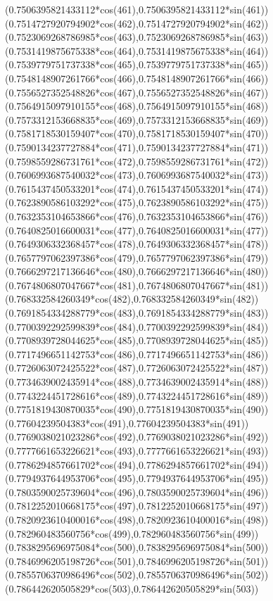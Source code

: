 {({0.7506395821433112*cos(461)},{0.7506395821433112*sin(461)})
({0.7514727920794902*cos(462)},{0.7514727920794902*sin(462)})
({0.7523069268786985*cos(463)},{0.7523069268786985*sin(463)})
({0.7531419875675338*cos(464)},{0.7531419875675338*sin(464)})
({0.7539779751737338*cos(465)},{0.7539779751737338*sin(465)})
({0.7548148907261766*cos(466)},{0.7548148907261766*sin(466)})
({0.7556527352548826*cos(467)},{0.7556527352548826*sin(467)})
({0.7564915097910155*cos(468)},{0.7564915097910155*sin(468)})
({0.7573312153668835*cos(469)},{0.7573312153668835*sin(469)})
({0.7581718530159407*cos(470)},{0.7581718530159407*sin(470)})
({0.7590134237727884*cos(471)},{0.7590134237727884*sin(471)})
({0.7598559286731761*cos(472)},{0.7598559286731761*sin(472)})
({0.7606993687540032*cos(473)},{0.7606993687540032*sin(473)})
({0.7615437450533201*cos(474)},{0.7615437450533201*sin(474)})
({0.7623890586103292*cos(475)},{0.7623890586103292*sin(475)})
({0.7632353104653866*cos(476)},{0.7632353104653866*sin(476)})
({0.7640825016600031*cos(477)},{0.7640825016600031*sin(477)})
({0.7649306332368457*cos(478)},{0.7649306332368457*sin(478)})
({0.7657797062397386*cos(479)},{0.7657797062397386*sin(479)})
({0.7666297217136646*cos(480)},{0.7666297217136646*sin(480)})
({0.7674806807047667*cos(481)},{0.7674806807047667*sin(481)})
({0.768332584260349*cos(482)},{0.768332584260349*sin(482)})
({0.7691854334288779*cos(483)},{0.7691854334288779*sin(483)})
({0.7700392292599839*cos(484)},{0.7700392292599839*sin(484)})
({0.7708939728044625*cos(485)},{0.7708939728044625*sin(485)})
({0.7717496651142753*cos(486)},{0.7717496651142753*sin(486)})
({0.7726063072425522*cos(487)},{0.7726063072425522*sin(487)})
({0.7734639002435914*cos(488)},{0.7734639002435914*sin(488)})
({0.7743224451728616*cos(489)},{0.7743224451728616*sin(489)})
({0.7751819430870035*cos(490)},{0.7751819430870035*sin(490)})
({0.77604239504383*cos(491)},{0.77604239504383*sin(491)})
({0.7769038021023286*cos(492)},{0.7769038021023286*sin(492)})
({0.7777661653226621*cos(493)},{0.7777661653226621*sin(493)})
({0.7786294857661702*cos(494)},{0.7786294857661702*sin(494)})
({0.7794937644953706*cos(495)},{0.7794937644953706*sin(495)})
({0.7803590025739604*cos(496)},{0.7803590025739604*sin(496)})
({0.7812252010668175*cos(497)},{0.7812252010668175*sin(497)})
({0.7820923610400016*cos(498)},{0.7820923610400016*sin(498)})
({0.782960483560756*cos(499)},{0.782960483560756*sin(499)})
({0.7838295696975084*cos(500)},{0.7838295696975084*sin(500)})
({0.7846996205198726*cos(501)},{0.7846996205198726*sin(501)})
({0.7855706370986496*cos(502)},{0.7855706370986496*sin(502)})
({0.786442620505829*cos(503)},{0.786442620505829*sin(503)})
}

